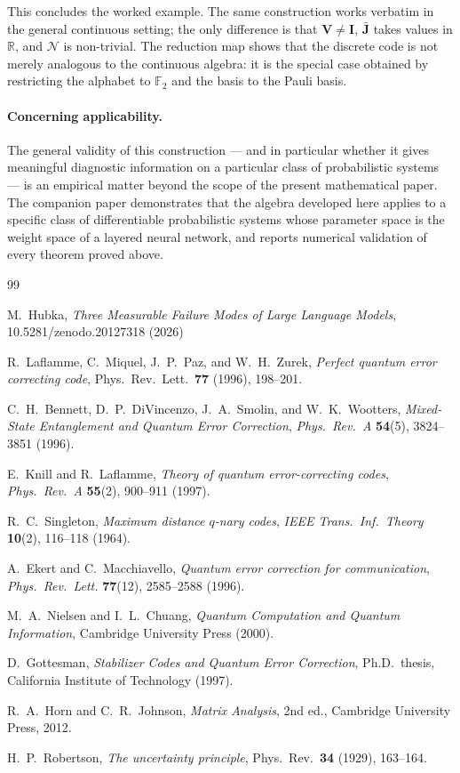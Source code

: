 \documentclass[11pt,a4paper]{article}
\theoremstyle{definition}
\newcommand{\Vm}{\mathbf{V}}
\newcommand{\Jm}{\mathbf{J}}
\newcommand{\Imat}{\mathbf{I}}
\newcommand{\Rbb}{\mathbb{R}}
\newcommand{\Fbb}{\mathbb{F}}
\newcommand{\Nop}{\mathcal{N}}
\begin{document}
This concludes the worked example. The same construction works verbatim in the general continuous setting; the only difference is that $\Vm \neq \Imat$, $\bar{\Jm}$ takes values in $\Rbb$, and $\Nop$ is non-trivial. The reduction map shows that the discrete code is not merely analogous to the continuous algebra: it is the special case obtained by restricting the alphabet to $\Fbb_2$ and the basis to the Pauli basis.

\paragraph{Concerning applicability.}
The general validity of this construction --- and in particular whether it gives meaningful diagnostic information on a particular class of probabilistic systems --- is an empirical matter beyond the scope of the present mathematical paper. The companion paper \cite{ThreeModesLLM} demonstrates that the algebra developed here applies to a specific class of differentiable probabilistic systems whose parameter space is the weight space of a layered neural network, and reports numerical validation of every theorem proved above.

\newpage

\begin{thebibliography}{99}

M.~Hubka, \emph{Three Measurable Failure Modes of Large Language Models}, 10.5281/zenodo.20127318 (2026)

R.~Laflamme, C.~Miquel, J.~P.~Paz, and W.~H.~Zurek, \emph{Perfect quantum error correcting code}, Phys.\ Rev.\ Lett.\ \textbf{77} (1996), 198--201.

C.~H.~Bennett, D.~P.~DiVincenzo, J.~A.~Smolin, and W.~K.~Wootters, \emph{Mixed-State Entanglement and Quantum Error Correction}, \emph{Phys.\ Rev.\ A} \textbf{54}(5), 3824--3851 (1996).

E.~Knill and R.~Laflamme, \emph{Theory of quantum error-correcting codes}, \emph{Phys.\ Rev.\ A} \textbf{55}(2), 900--911 (1997).

R.~C.~Singleton,
\emph{Maximum distance $q$-nary codes}, \emph{IEEE Trans.\ Inf.\ Theory} \textbf{10}(2), 116--118 (1964).

A.~Ekert and C.~Macchiavello, \emph{Quantum error correction for communication}, \emph{Phys.\ Rev.\ Lett.} \textbf{77}(12), 2585--2588 (1996).

M.~A.~Nielsen and I.~L.~Chuang, \emph{Quantum Computation and Quantum Information}, Cambridge University Press (2000).

D.~Gottesman, \emph{Stabilizer Codes and Quantum Error Correction}, Ph.D.\ thesis, California Institute of Technology (1997).

R.~A.~Horn and C.~R.~Johnson, \emph{Matrix Analysis}, 2nd ed., Cambridge University Press, 2012.

H.~P.~Robertson, \emph{The uncertainty principle}, Phys.\ Rev.\ \textbf{34} (1929), 163--164.

\end{thebibliography}
\end{document}
